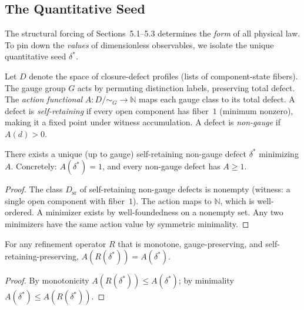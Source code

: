 \subsection{The Quantitative Seed}
\label{sec:forcing:seed}

The structural forcing of Sections~5.1--5.3 determines the \emph{form} of all
physical law.  To pin down the \emph{values} of dimensionless observables, we
isolate the unique quantitative seed $\delta^*$.

\begin{definition}
Let $D$ denote the space of closure-defect profiles (lists of
component-state fibers).  The gauge group $G$ acts by permuting
distinction labels, preserving total defect.  The \emph{action
functional} $A : D/{\sim_G} \to \mathbb{N}$ maps each gauge class to
its total defect.  A defect is \emph{self-retaining} if every open
component has fiber~$1$ (minimum nonzero), making it a fixed point
under witness accumulation.  A defect is \emph{non-gauge} if $A(d) > 0$.
\end{definition}

\begin{theorem}
\label{thm:seed-existence}
There exists a unique (up to gauge) self-retaining non-gauge defect
$\delta^*$ minimizing $A$.  Concretely: $A(\delta^*) = 1$, and every
non-gauge defect has $A \ge 1$.
\begin{proof}
The class $D_\text{sr}$ of self-retaining non-gauge defects is nonempty
(witness: a single open component with fiber~$1$).  The action maps to
$\mathbb{N}$, which is well-ordered.  A minimizer exists by
well-foundedness on a nonempty set.  Any two minimizers have the same
action value by symmetric minimality.
\end{proof}
\end{theorem}

\begin{theorem}
\label{thm:seed-fixed}
For any refinement operator $R$ that is monotone, gauge-preserving,
and self-retaining-preserving, $A(R(\delta^*)) = A(\delta^*)$.
\begin{proof}
By monotonicity $A(R(\delta^*)) \le A(\delta^*)$; by minimality
$A(\delta^*) \le A(R(\delta^*))$.
\end{proof}
\end{theorem}

